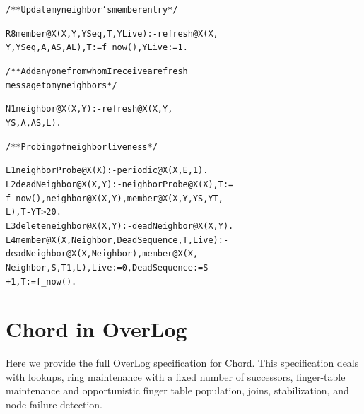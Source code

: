 \documentclass{sig-alt-full}
\def\Lang{OverLog\xspace}
\newenvironment{overlog}{\begin{alltt}\small}{\end{alltt}}
\begin{document}
\begin{overlog}
/** Update my neighbor's member entry */

R8 member@X(X, Y, YSeq, T, YLive) :- refresh@X(X,
  Y, YSeq, A, AS, AL), T := f_now(), YLive := 1.


/** Add anyone from whom I receive a refresh
  message to my neighbors */

N1 neighbor@X(X, Y) :- refresh@X(X, Y,
  YS, A, AS, L).


/** Probing of neighbor liveness */

L1 neighborProbe@X(X) :- periodic@X(X, E, 1).
L2 deadNeighbor@X(X, Y) :- neighborProbe@X(X), T :=
  f_now(), neighbor@X(X, Y), member@X(X, Y, YS, YT,
  L), T - YT > 20.
L3 delete neighbor@X(X, Y) :- deadNeighbor@X(X, Y).
L4 member@X(X, Neighbor, DeadSequence, T, Live) :-
  deadNeighbor@X(X, Neighbor), member@X(X,
  Neighbor, S, T1, L), Live := 0, DeadSequence := S
  + 1, T:= f_now().
\end{overlog}



\section{Chord in \Lang}
\label{sec:chordOverlog}

Here we provide the full \Lang specification for Chord. This
specification deals with lookups, ring maintenance with a fixed number
of successors, finger-table maintenance and opportunistic finger table
population, joins, stabilization, and node failure detection.
\end{document}
